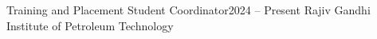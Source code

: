 \resumeSubheading
    {Training and Placement Student Coordinator}{2024 -- Present}
    {Rajiv Gandhi Institute of Petroleum Technology}{}
